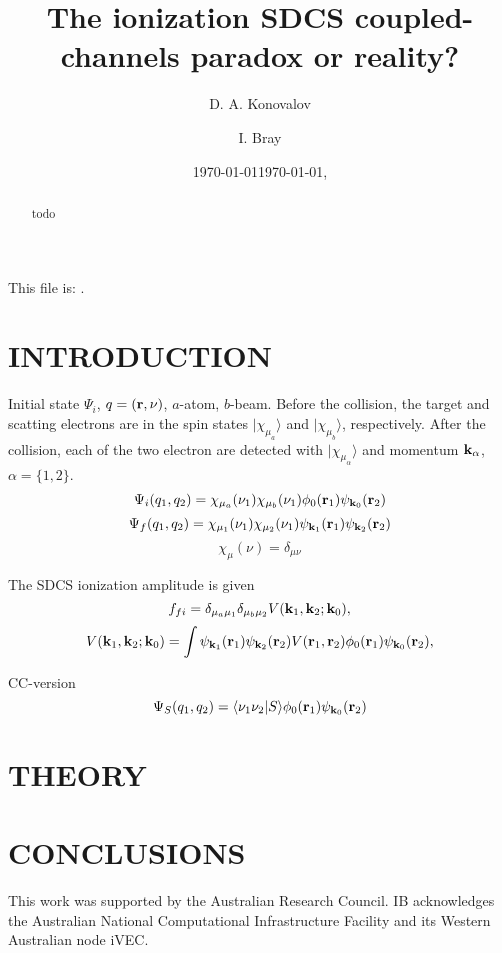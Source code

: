 \documentclass[aip
, pra
, showpacs
, aps
, twocolumn
, groupedaddress
, floatfix
]{revtex4}
\newcommand{\beq}{\begin{equation}}
\newcommand{\eeq}{\end{equation}}
\newcommand{\bfr}{{\bf r}}
\newcommand{\bfk}{{\bf k}}
\begin{document}
\title {The ionization SDCS coupled-channels paradox or reality?}

\author{D. A. Konovalov}

\author{I. Bray}



\date{\today}
\date{\today, \currenttime}

\begin{abstract}
todo
\end{abstract}

\maketitle
This file is: \currfilename.



\section{INTRODUCTION}
Initial state $\Psi_i$, $q=(\bfr, \nu)$, $a$-atom, $b$-beam.
Before the collision, the target and scatting electrons are in the spin states $| \chi_{\mu_a} \rangle$ and $| \chi_{\mu_b} \rangle$, respectively.
After the collision, each of the two electron are detected with $| \chi_{\mu_\alpha} \rangle$ and momentum $\bfk_\alpha$, $\alpha=\{1,2\}$.
\beq
\Psi_i(q_1, q_2) = \chi_{\mu_a}(\nu_1) \chi_{\mu_b}(\nu_1) \phi_0(\bfr_1) \psi_{\bfk_0}(\bfr_2) 
\eeq
\beq
\Psi_f(q_1, q_2) = \chi_{\mu_1}(\nu_1) \chi_{\mu_2}(\nu_1) \psi_{\bfk_1}(\bfr_1) \psi_{\bfk_2}(\bfr_2)
\eeq
\beq
\chi_{\mu}(\nu) =\delta_{\mu \nu}
\eeq

The SDCS ionization amplitude is given
\beq
f_{fi} = \delta_{\mu_a \mu_1} \delta_{\mu_b \mu_2} V(\bfk_1,\bfk_2; \bfk_0),
\eeq
\beq
V(\bfk_1,\bfk_2; \bfk_0) = \int \psi_{\bfk_1}(\bfr_1) \psi_{\bfk_2}(\bfr_2) V(\bfr_1, \bfr_2) \phi_0(\bfr_1) \psi_{\bfk_0}(\bfr_2),
\eeq

CC-version
\beq
\Psi_S(q_1, q_2) = \langle \nu_1 \nu_2 | S \rangle \phi_0(\bfr_1) \psi_{\bfk_0}(\bfr_2)
\eeq

\section{THEORY}




\section{CONCLUSIONS}



\begin{acknowledgments}
This work was supported by the Australian Research Council. IB
acknowledges the Australian National Computational Infrastructure
Facility and its Western Australian node iVEC.
\end{acknowledgments}





\end{document}
